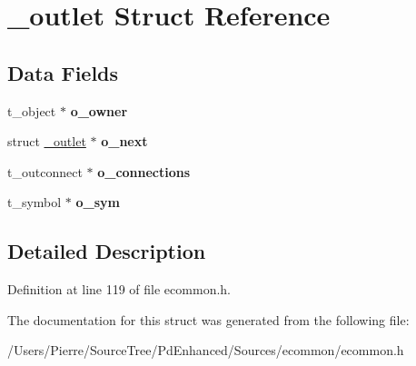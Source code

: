 \hypertarget{struct__outlet}{\section{\-\_\-outlet Struct Reference}
\label{struct__outlet}
}
\subsection*{Data Fields}
\begin{DoxyCompactItemize}
\item 
\hypertarget{struct__outlet_a7bdd65bdf46102a176835f19b3a2305b}{t\-\_\-object $\ast$ {\bfseries o\-\_\-owner}}\label{struct__outlet_a7bdd65bdf46102a176835f19b3a2305b}

\item 
\hypertarget{struct__outlet_ae26edec286a8bef11baa15ac0b9480e8}{struct \hyperlink{struct__outlet}{\-\_\-outlet} $\ast$ {\bfseries o\-\_\-next}}\label{struct__outlet_ae26edec286a8bef11baa15ac0b9480e8}

\item 
\hypertarget{struct__outlet_a18a291d6dfc4d4f5c380381138774af4}{t\-\_\-outconnect $\ast$ {\bfseries o\-\_\-connections}}\label{struct__outlet_a18a291d6dfc4d4f5c380381138774af4}

\item 
\hypertarget{struct__outlet_a305d36ab508da845dc8909a4b8570f9a}{t\-\_\-symbol $\ast$ {\bfseries o\-\_\-sym}}\label{struct__outlet_a305d36ab508da845dc8909a4b8570f9a}

\end{DoxyCompactItemize}


\subsection{Detailed Description}


Definition at line 119 of file ecommon.\-h.



The documentation for this struct was generated from the following file\-:\begin{DoxyCompactItemize}
\item 
/\-Users/\-Pierre/\-Source\-Tree/\-Pd\-Enhanced/\-Sources/ecommon/ecommon.\-h\end{DoxyCompactItemize}
